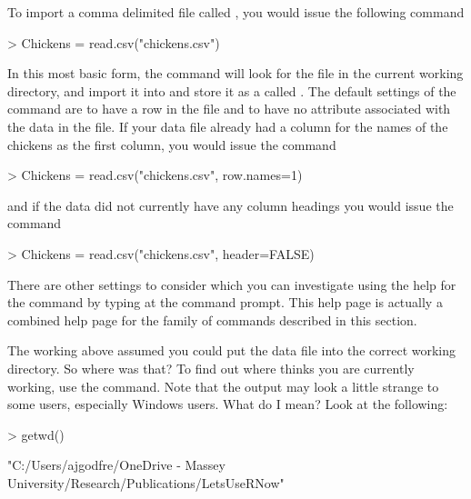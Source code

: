 To import a comma delimited file called , you would issue the following command 

\begin{Schunk}
\begin{Sinput}
> Chickens = read.csv("chickens.csv") 
\end{Sinput}
\end{Schunk}

In this most basic form, the  
 command will look for the  file in the current working directory, and import it into \R{} and store it as a  called . The default settings of the  command are to have a  row in the file and to have no  attribute associated with the data in the file. If your data file already had a column for the names of the chickens as the first column, you would issue the command 

\begin{Schunk}
\begin{Sinput}
> Chickens = read.csv("chickens.csv", row.names=1) 
\end{Sinput}
\end{Schunk}

and if the data did not currently have any column headings you would issue the command 

\begin{Schunk}
\begin{Sinput}
> Chickens = read.csv("chickens.csv", header=FALSE) 
\end{Sinput}
\end{Schunk}

 
There are other settings to consider which you can investigate using the help for the  command by typing  at the command prompt. This help page is actually a combined help page for the family of commands described in this section. 
 
The working above assumed you could put the data file into the correct working directory.  So where was that? To find out where \R{} thinks you are currently working, use the  command. Note that the output may look a little strange to some users, especially Windows users. What do I mean? Look at the following: 
\begin{Schunk}
\begin{Sinput}
> getwd() 
\end{Sinput}
\begin{Soutput}
[1] "C:/Users/ajgodfre/OneDrive - Massey University/Research/Publications/LetsUseRNow"
\end{Soutput}
\end{Schunk}

